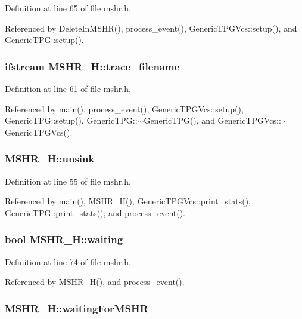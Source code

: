 Definition at line 65 of file mshr.h.

Referenced by DeleteInMSHR(), process\_\-event(), GenericTPGVcs::setup(), and GenericTPG::setup().
\subsubsection[{trace\_\-filename}]{\setlength{\rightskip}{0pt plus 5cm}ifstream {\bf MSHR\_\-H::trace\_\-filename}}\label{classMSHR__H_6e19d2203f1ad9bf624596e00d600516}




Definition at line 61 of file mshr.h.

Referenced by main(), process\_\-event(), GenericTPGVcs::setup(), GenericTPG::setup(), GenericTPG::$\sim$GenericTPG(), and GenericTPGVcs::$\sim$GenericTPGVcs().
\subsubsection[{unsink}]{ {\bf MSHR\_\-H::unsink}}\label{classMSHR__H_9e26b7281b5d4ec954954209aae9ebfa}




Definition at line 55 of file mshr.h.

Referenced by main(), MSHR\_\-H(), GenericTPGVcs::print\_\-stats(), GenericTPG::print\_\-stats(), and process\_\-event().
\subsubsection[{waiting}]{\setlength{\rightskip}{0pt plus 5cm}bool {\bf MSHR\_\-H::waiting}}\label{classMSHR__H_8c3c17cf51802a693f7ae295e9254ff5}




Definition at line 74 of file mshr.h.

Referenced by MSHR\_\-H(), and process\_\-event().
\subsubsection[{waitingForMSHR}]{ {\bf MSHR\_\-H::waitingForMSHR}}\label{classMSHR__H_f5e0e6db120111f53f076bb86456fea5}




